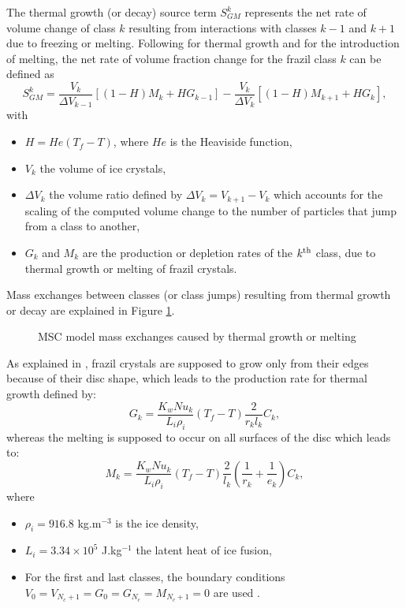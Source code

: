 The thermal growth (or decay) source term $S_{GM}^{k}$ represents the net rate of volume change of class $k$
resulting from interactions with classes $k-1$ and $k+1$ due to freezing or melting.
Following \cite{shen_JHR_2010} for thermal growth and \cite{holland_JFM_2005} for the introduction of melting, the net rate of volume fraction change for the frazil class $k$ can be defined as
\begin{equation}
S_{GM}^{k}=\frac{V_{k}}{\Delta V_{k-1}}\left [ (1-H)M_{k}+HG_{k-1} \right ]-\frac{V_{k}}{\Delta V_{k}}\left [ (1-H)M_{k+1}+HG_{k} \right ],
\label{eq:model:sgm:source}
\end{equation}
with
\begin{itemize}
	\item $H=He(T_{f}-T)$, where $He$ is the Heaviside function,
    \item $V_{k}$ the volume of ice crystals,
    \item $\Delta V_{k}$ the volume ratio defined by $\Delta V_{k}=V_{k+1}-V_{k}$ which accounts for the scaling of the computed volume change to the number of particles that jump from a class to another,
    \item $G_k$ and $M_k$ are the production or depletion rates of the $k^{\rm{th}}$ class, due to thermal growth or melting of frazil crystals.
\end{itemize}

Mass exchanges between classes (or class jumps) resulting from thermal growth or decay are explained in Figure \ref{fig:sgm_class_jumps}.
\begin{figure}[H]
    \begin{center}
    \end{center}
    \caption{MSC model mass exchanges caused by thermal growth or melting}
    \label{fig:sgm_class_jumps}
\end{figure}

As explained in \cite{daly_1994}, frazil crystals are supposed to
grow only from their edges because of their disc shape, which
leads to the production rate for thermal growth defined by:
\begin{equation}
G_{k}=\frac{K_{w}Nu_{k}}{L_{i}\rho_{i}}(T_{f}-T)\frac{2}{r_{k}l_k}C_{k},
\label{eq:model:sgm:source_growth}
\end{equation}
whereas the melting is supposed to occur on all surfaces of the
disc which leads to:
\begin{equation}
M_{k}=\frac{K_{w}Nu_{k}}{L_{i}\rho_{i}}(T_{f}-T)\frac{2}{l_{k}}\left(\frac{1}{r_{k}}+\frac{1}{e_{k}}\right)C_{k},
\label{eq:model:sgm:source_melting}
\end{equation}
where
\begin{itemize}
	\item $\rho_{i}=916.8$ kg.m$^{-3}$ is the ice density,
	\item $L_{i}=3.34 \times 10^5$ J.kg$^{-1}$ the latent heat of ice fusion,
    \item For the first and last classes, the boundary conditions $V_{0}=V_{N_c+1}=G_{0}=G_{N_c}=M_{N_c+1}=0$
are used \cite{holland_JFM_2005}.
\end{itemize}


